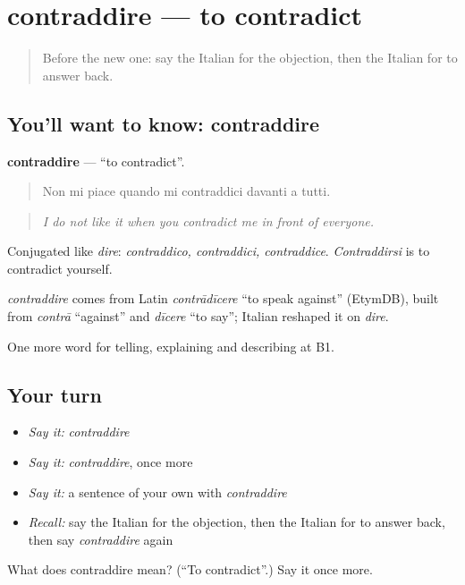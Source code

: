 \section[contraddire]{contraddire — to contradict}

\label{lesson:IT-C341-contraddire}



\begin{quote}
Before the new one: say the Italian for the objection, then the Italian for to answer back.
\end{quote}

\subsection*{You'll want to know: contraddire}
\textbf{contraddire} — \textquotedblleft{}to contradict\textquotedblright{}.

\begin{quote}
Non mi piace quando mi contraddici davanti a tutti.
\end{quote}

\begin{quote}
\emph{I do not like it when you contradict me in front of everyone.}
\end{quote}

Conjugated like \emph{dire}: \emph{contraddico, contraddici, contraddice}. \emph{Contraddirsi} is to contradict yourself.

\begin{cousinweb}
\emph{contraddire} comes from Latin \emph{contrādīcere} \textquotedblleft{}to speak against\textquotedblright{} (EtymDB), built from \emph{contrā} \textquotedblleft{}against\textquotedblright{} and \emph{dīcere} \textquotedblleft{}to say\textquotedblright{}; Italian reshaped it on \emph{dire}.
\end{cousinweb}

\begin{grammarlens}[title={What you've built}]
One more word for telling, explaining and describing at B1.
\end{grammarlens}

\subsection*{Your turn}
\begin{itemize}
\raggedright
  \item \emph{Say it:} \emph{contraddire}
  \item \emph{Say it:} \emph{contraddire}, once more
  \item \emph{Say it:} a sentence of your own with \emph{contraddire}
  \item \emph{Recall:} say the Italian for the objection, then the Italian for to answer back, then say \emph{contraddire} again
\end{itemize}

\begin{tcolorbox}[breakable,colback=teal!4,colframe=teal!35!black,title={Before you move on}]
What does contraddire mean? (\textquotedblleft{}To contradict\textquotedblright{}.) Say it once more.
\end{tcolorbox}
